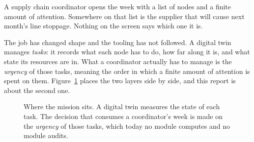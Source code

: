 A supply chain coordinator opens the week with a list of nodes and a finite amount of
attention. Somewhere on that list is the supplier that will cause next month's line
stoppage. Nothing on the screen says which one it is.

The job has changed shape and the tooling has not followed. A digital twin manages
\emph{tasks}: it records what each node has to do, how far along it is, and what state its
resources are in. What a coordinator actually has to manage is the \emph{urgency} of those
tasks, meaning the order in which a finite amount of attention is spent on them.
Figure~\ref{fig:couche} places the two layers side by side, and this report is about the
second one.

\begin{figure}[htbp]
\centering
{}
\caption[From managing tasks to managing their urgency]{Where the mission sits. A digital
twin measures the state of each task. The decision that consumes a coordinator's week is made
on the \emph{urgency} of those tasks, which today no module computes and no module audits.}
\label{fig:couche}
\end{figure}

